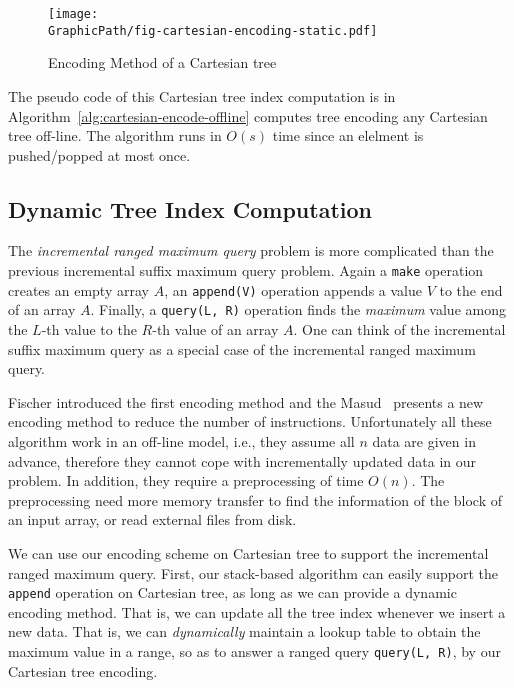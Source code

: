 \begin{figure}[!thb]
  \centering
  \texttt{[image: \\GraphicPath/fig-cartesian-encoding-static.pdf]}
  \caption{Encoding Method of a Cartesian tree}
  \label{fig:fig-cartesian-encoding-static}
\end{figure}

The pseudo code of this Cartesian tree index computation is in
Algorithm~\ref{alg:cartesian-encode-offline} computes tree encoding
any Cartesian tree off-line.  The algorithm runs in $O(s)$ time since
an elelment is pushed/popped at most once.



\subsection{Dynamic Tree Index Computation}


The {\em incremental ranged maximum query} problem is more complicated
than the previous incremental suffix maximum query problem.  Again a
{\tt make} operation creates an empty array $A$, an {\tt append(V)}
operation appends a value $V$ to the end of an array $A$.  Finally, a
{\tt query(L, R)} operation finds the {\em maximum} value among the
$L$-th value to the $R$-th value of an array $A$.  One can think of
the incremental suffix maximum query as a special case of the
incremental ranged maximum query.

Fischer introduced the first encoding method and the
Masud~\cite{Hasan2010CacheOA} presents a new encoding method to reduce
the number of instructions.  Unfortunately all these algorithm work in
an off-line model, i.e., they assume all $n$ data are given in
advance, therefore they cannot cope with incrementally updated data in
our problem.  In addition, they require a preprocessing of time
$O(n)$.  The preprocessing need more memory transfer to find the
information of the block of an input array, or read external files
from disk.


We can use our encoding scheme on Cartesian tree to support the
incremental ranged maximum query.  First, our stack-based algorithm
can easily support the {\tt append} operation on Cartesian tree, as
long as we can provide a dynamic encoding method.  That is, we can
update all the tree index whenever we insert a new data.  That is, we
can {\em dynamically} maintain a lookup table to obtain the maximum
value in a range, so as to answer a ranged query {\tt query(L, R)},
by our Cartesian tree encoding.  

